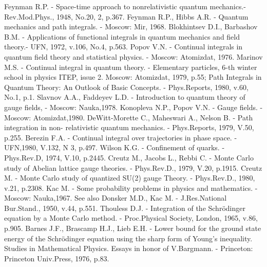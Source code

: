 \documentclass[11pt]{article}
\begin{document}
\begin{thebibliography}{99}
  Feynman R.P. - Space-time approach to nonrelativistic quantum                         mechanics.-
             Rev.Mod.Phys., 1948, No.20, 2, p.367.
  Feynman R.P., Hibbs A.R. - Quantum mechanics and path 
             integrals. - Moscow: Mir, 1968.
  Blokhintsev D.I., Barbashov B.M. - 
             Applications of functional  integrals in quantum mechanics 
             and field theory.- UFN, 1972, v.106, No.4, p.563.
  Popov V.N. - Continual integrals in quantum field theory 
             and statistical physics. - Moscow: Atomizdat, 1976.
  Marinov M.S. - Continual integral in quantum theory. - 
             Elementary particles,  6-th winter school in physics ITEP, 
             issue 2. Moscow: Atomizdat, 1979, p.55;  
             Path Integrals in Quantum Theory: An Outlook of Basic Concepts. -
             Phys.Reports, 1980, v.60, No.1, p.1.
  Slavnov A.A., Faddeyev L.D. - Introduction to quantum theory of
             gauge fields, - Moscow: Nauka,1978.
  Konopleva N.P., Popov V.N. - Gauge fields. - Moscow: Atomizdat,1980.
  DeWitt-Morette C., Maheswari A., Nelson B. - Path integration in non-
             relativistic quantum mechanics. - Phys.Reports, 1979, V.50, p.255.
  Berezin F.A. - Continual integral over trajectories in phase space. -               UFN,1980, V.132, N 3, p.497.
 Wilson K.G. - Confinement of quarks. - Phys.Rev.D, 1974, V.10, p.2445.
 Creutz M., Jacobs L., Rebbi C. - Monte Carlo study of Abelian 
             lattice gauge  theories. - Phys.Rev.D., 1979, V.20, p.1915.
 Creutz M. - Monte Carlo study of quantized SU(2) gauge Theory. 
             - Phys.Rev.D., 1980, v.21, p.2308.
 Kac M. -  Some probability problems in physics and mathematics. 
             - Moscow: Nauka,1967. See also
              Donsker M.D., Kac M. - J.Res.National Bur.Stand., 1950, v.44,
              p.551.
 Thouless D.J. - Integration of the  Schr\"{o}dinger equation by 
             a Monte Carlo method. - Proc.Physical Society, London, 1965, v.86, p.905.
 Barnes J.F., Brascamp H.J., Lieb E.H. - Lower bound for the 
             ground state  energy of the Schr\"{o}dinger equation using the 
             sharp form of Young's inequality. Studies in Mathematical 
             Physics. Essays in honor of V.Bargmann. -
             Princeton: Princeton Univ.Press, 1976, p.83.

\end{thebibliography}
\end{document}
